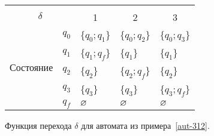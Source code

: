 \begin{figure}
\centering
\begin{tabular}{lllll}
\toprule
%
\multicolumn{2}{c}{\multirow{2}{*}{\Large $\delta$}}
	& \multicolumn{3}{c}{\text{Вход}} \\
%
\cmidrule(rl){3-5}
%
\multicolumn{2}{c}{}
	& \multicolumn{1}{c}{1}
    & \multicolumn{1}{c}{2}
    & \multicolumn{1}{c}{3} \\
%
\midrule
%
\multirow{5}{*}{Состояние}
    & $q_0$ & \{$q_0;q_1$\} & \{$q_0;q_2$\} & \{$q_0;q_3$\} \\
    & $q_1$ & \{$q_1;q_f$\} & \{$q_1$\}     & \{$q_1$\}     \\
    & $q_2$ & \{$q_2$\}     & \{$q_2;q_f$\} & \{$q_2$\}     \\
    & $q_3$ & \{$q_3$\}     & \{$q_3$\}     & \{$q_3;q_f$\} \\
    & $q_f$ & $\varnothing$         & $\varnothing$         & $\varnothing$         \\
\bottomrule
\end{tabular}
\caption{Функция перехода $\delta$ для автомата из примера~\ref{aut-312}.}
\label{tab2}
\end{figure}
